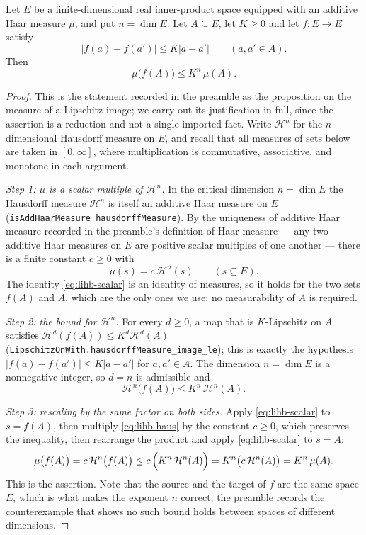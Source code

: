\begin{lemma}
Let $E$ be a finite-dimensional real inner-product space equipped with an
additive Haar measure $\mu$, and put $n=\dim E$. Let $A\subseteq E$, let
$K\ge0$ and let $f:E\to E$ satisfy
\[
  |f(a)-f(a')|\le K|a-a'|\qquad(a,a'\in A).
\]
Then
\[
  \mu\bigl(f(A)\bigr)\le K^{n}\,\mu(A).
\]
\end{lemma}
\begin{proof}
This is the statement recorded in the preamble as the proposition on the
measure of a Lipschitz image; we carry out its justification in full, since the
assertion is a reduction and not a single imported fact. Write $\mathcal H^{n}$
for the $n$-dimensional Hausdorff measure on $E$, and recall that all measures
of sets below are taken in $[0,\infty]$, where multiplication is commutative,
associative, and monotone in each argument.

\emph{Step 1: $\mu$ is a scalar multiple of $\mathcal H^{n}$.}
In the critical dimension $n=\dim E$ the Hausdorff measure $\mathcal H^{n}$ is
itself an additive Haar measure on $E$
(\texttt{isAddHaarMeasure\_hausdorffMeasure}). By the uniqueness of additive
Haar measure recorded in the preamble's definition of Haar measure --- any two
additive Haar measures on $E$ are positive scalar multiples of one another ---
there is a finite constant $c\ge0$ with
\begin{equation}\label{eq:lihb-scalar}
  \mu(s)=c\,\mathcal H^{n}(s)\qquad(s\subseteq E).
\end{equation}
The identity \eqref{eq:lihb-scalar} is an identity of measures, so it holds for
the two sets $f(A)$ and $A$, which are the only ones we use; no measurability of
$A$ is required.

\emph{Step 2: the bound for $\mathcal H^{n}$.}
For every $d\ge0$, a map that is $K$-Lipschitz on $A$ satisfies
$\mathcal H^{d}(f(A))\le K^{d}\mathcal H^{d}(A)$
(\texttt{LipschitzOnWith.hausdorffMeasure\_image\_le}); this is exactly the
hypothesis $|f(a)-f(a')|\le K|a-a'|$ for $a,a'\in A$. The dimension
$n=\dim E$ is a nonnegative integer, so $d=n$ is admissible and
\begin{equation}\label{eq:lihb-haus}
  \mathcal H^{n}\bigl(f(A)\bigr)\le K^{n}\,\mathcal H^{n}(A).
\end{equation}

\emph{Step 3: rescaling by the same factor on both sides.}
Apply \eqref{eq:lihb-scalar} to $s=f(A)$, then multiply
\eqref{eq:lihb-haus} by the constant $c\ge0$, which preserves the inequality,
then rearrange the product and apply \eqref{eq:lihb-scalar} to $s=A$:
\[
  \mu\bigl(f(A)\bigr)=c\,\mathcal H^{n}\bigl(f(A)\bigr)
   \le c\,\Bigl(K^{n}\,\mathcal H^{n}(A)\Bigr)
   =K^{n}\bigl(c\,\mathcal H^{n}(A)\bigr)
   =K^{n}\,\mu(A).
\]
This is the assertion. Note that the source and the target of $f$ are the same
space $E$, which is what makes the exponent $n$ correct; the preamble records
the counterexample that shows no such bound holds between spaces of different
dimensions.
\end{proof}
